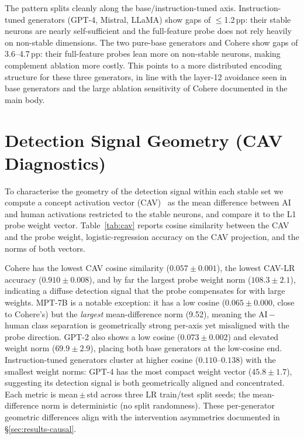 \documentclass[11pt]{article}
\begin{document}
The pattern splits cleanly along the base/instruction-tuned axis. Instruction-tuned generators (GPT-4, Mistral, LLaMA) show gaps of $\leq$1.2\,pp: their stable neurons are nearly self-sufficient and the full-feature probe does not rely heavily on non-stable dimensions. The two pure-base generators and Cohere show gaps of 3.6--4.7\,pp: their full-feature probes lean more on non-stable neurons, making complement ablation more costly. This points to a more distributed encoding structure for these three generators, in line with the layer-12 avoidance seen in base generators and the large ablation sensitivity of Cohere documented in the main body.

\section{Detection Signal Geometry (CAV Diagnostics)}
\label{app:cav}

To characterise the geometry of the detection signal within each stable set we compute a concept activation vector (CAV)~\citep{kim2018tcav} as the mean difference between AI and human activations restricted to the stable neurons, and compare it to the L1 probe weight vector. Table~\ref{tab:cav} reports cosine similarity between the CAV and the probe weight, logistic-regression accuracy on the CAV projection, and the norms of both vectors.

Cohere has the lowest CAV cosine similarity ($0.057 \pm 0.001$), the lowest CAV-LR accuracy ($0.910 \pm 0.008$), and by far the largest probe weight norm ($108.3 \pm 2.1$), indicating a diffuse detection signal that the probe compensates for with large weights. MPT-7B is a notable exception: it has a low cosine ($0.065 \pm 0.000$, close to Cohere's) but the \textit{largest} mean-difference norm (9.52), meaning the AI\,$-$\,human class separation is geometrically strong per-axis yet misaligned with the probe direction. GPT-2 also shows a low cosine ($0.073 \pm 0.002$) and elevated weight norm ($69.9 \pm 2.9$), placing both base generators at the low-cosine end. Instruction-tuned generators cluster at higher cosine ($0.110$--$0.138$) with the smallest weight norms: GPT-4 has the most compact weight vector ($45.8 \pm 1.7$), suggesting its detection signal is both geometrically aligned and concentrated. Each metric is mean\,$\pm$\,std across three LR train/test split seeds; the mean-difference norm is deterministic (no split randomness). These per-generator geometric differences align with the intervention asymmetries documented in §\ref{sec:results-causal}.
\end{document}
